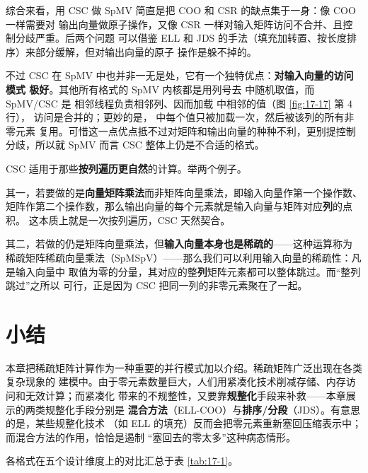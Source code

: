 综合来看，用 CSC 做 SpMV 简直是把 COO 和 CSR 的缺点集于一身：像 COO 一样需要对
输出向量做原子操作，又像 CSR 一样对输入矩阵访问不合并、且控制分歧严重。后两个问题
可以借鉴 ELL 和 JDS 的手法（填充加转置、按长度排序）来部分缓解，但对输出向量的原子
操作是躲不掉的。

不过 CSC 在 SpMV 中也并非一无是处，它有一个独特优点：\textbf{对输入向量的访问模式
极好}。其他所有格式的 SpMV 内核都是用列号去  中随机取值，而 SpMV/CSC 是
相邻线程负责相邻列、因而加载  中相邻的值（图 \ref{fig:17-17} 第 4 行），
访问是合并的；更妙的是， 中每个值只被加载一次，然后被该列的所有非零元素
复用。可惜这一点优点抵不过对矩阵和输出向量的种种不利，更别提控制分歧，所以就 SpMV
而言 CSC 整体上仍是不合适的格式。

CSC 适用于那些\textbf{按列遍历更自然}的计算。举两个例子。

其一，若要做的是\textbf{向量矩阵乘法}而非矩阵向量乘法，即输入向量作第一个操作数、
矩阵作第二个操作数，那么输出向量的每个元素就是输入向量与矩阵对应\textbf{列}的点积。
这本质上就是一次按列遍历，CSC 天然契合。

其二，若做的仍是矩阵向量乘法，但\textbf{输入向量本身也是稀疏的}——这种运算称为
稀疏矩阵稀疏向量乘法（SpMSpV）——那么我们可以利用输入向量的稀疏性：凡是输入向量中
取值为零的分量，其对应的整\textbf{列}矩阵元素都可以整体跳过。而“整列跳过”之所以
可行，正是因为 CSC 把同一列的非零元素聚在了一起。

\section{小结}
\label{sec:spmv-summary}

本章把稀疏矩阵计算作为一种重要的并行模式加以介绍。稀疏矩阵广泛出现在各类复杂现象的
建模中。由于零元素数量巨大，人们用紧凑化技术削减存储、内存访问和无效计算；而紧凑化
带来的不规整性，又要靠\textbf{规整化}手段来补救——本章展示的两类规整化手段分别是
\textbf{混合方法}（ELL-COO）与\textbf{排序/分段}（JDS）。有意思的是，某些规整化技术
（如 ELL 的填充）反而会把零元素重新塞回压缩表示中；而混合方法的作用，恰恰是遏制
“塞回去的零太多”这种病态情形。

各格式在五个设计维度上的对比汇总于表 \ref{tab:17-1}。

